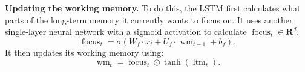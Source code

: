 \documentclass[12pt]{article}
\theoremstyle{definition}
\newcommand{\R}{\ensuremath{\bm{R}}}
\DeclareMathOperator{\focus}{focus}
\DeclareMathOperator{\ltm}{ltm}
\DeclareMathOperator{\wm}{wm}
\begin{document}
\medskip
\noindent \textbf{Updating the working memory.} To do this, the LSTM first 
calculates what parts of the long-term memory it currently wants to focus on. 
It uses another single-layer neural network with a sigmoid activation to 
calculate $\focus_{t} \in \R^{d}$. 
\begin{equation}
\focus_{t} = \sigma \left ( W_f \cdot x_t + U_f \cdot \wm_{t - 1} + b_f \right ). 
\end{equation} 
It then updates its working memory using:
\begin{equation}
\wm_{t} = \focus_{t} \odot \tanh(\ltm_{t}).
\end{equation} 
\end{document}
